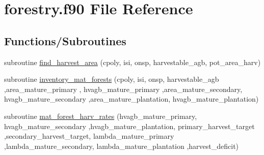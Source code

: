 \hypertarget{forestry_8f90}{}\section{forestry.\+f90 File Reference}
\label{forestry_8f90}
\subsection*{Functions/\+Subroutines}
\begin{DoxyCompactItemize}
\item 
subroutine \hyperlink{forestry_8f90_a6fb545f79f63a7861a1ef67cd05765e8}{find\+\_\+harvest\+\_\+area} (cpoly, isi, onsp, harvestable\+\_\+agb, pot\+\_\+area\+\_\+harv)
\item 
subroutine \hyperlink{forestry_8f90_a275d946887eb0b8f69712d9750c5fe29}{inventory\+\_\+mat\+\_\+forests} (cpoly, isi, onsp, harvestable\+\_\+agb                                                                                                                                                                                                                                       ,area\+\_\+mature\+\_\+primary   , hvagb\+\_\+mature\+\_\+primary                                                                                                                                                                               ,area\+\_\+mature\+\_\+secondary, hvagb\+\_\+mature\+\_\+secondary                                                                                                                                                                       ,area\+\_\+mature\+\_\+plantation, hvagb\+\_\+mature\+\_\+plantation)
\item 
subroutine \hyperlink{forestry_8f90_a898715995f682282189cfebd9d1fc175}{mat\+\_\+forest\+\_\+harv\+\_\+rates} (hvagb\+\_\+mature\+\_\+primary, hvagb\+\_\+mature\+\_\+secondary                                                                                                                                                                                   ,hvagb\+\_\+mature\+\_\+plantation, primary\+\_\+harvest\+\_\+target                                                                                                                                                                       ,secondary\+\_\+harvest\+\_\+target, lambda\+\_\+mature\+\_\+primary                                                                                                                                                                       ,lambda\+\_\+mature\+\_\+secondary, lambda\+\_\+mature\+\_\+plantation                                                                                                                                                               ,harvest\+\_\+deficit)

\end{DoxyCompactItemize}
